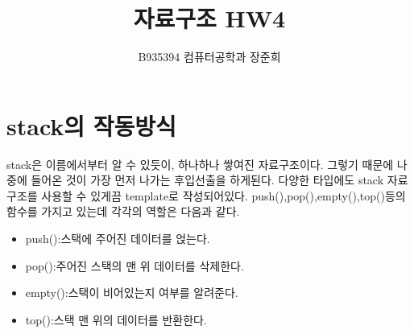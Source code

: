 \documentclass[a4paper,11pt]{article}
\begin{document}
\title{자료구조 HW4}
\author{B935394 컴퓨터공학과 장준희}
\maketitle
\newpage
\section{stack의 작동방식}
stack은 이름에서부터 알 수 있듯이, 하나하나 쌓여진 자료구조이다. 그렇기 때문에 나중에 들어온 것이 가장 먼저 나가는 후입선출을 하게된다. 다양한 타입에도 stack 자료구조를 사용할 수 있게끔 template로 작성되어있다. push(),pop(),empty(),top()등의 함수를 가지고 있는데 각각의 역할은 다음과 같다.
\begin{itemize}\item push():스택에 주어진 데이터를 얹는다.\item pop():주어진 스택의 맨 위 데이터를 삭제한다.\item empty():스택이 비어있는지 여부를 알려준다.\item top():스택 맨 위의 데이터를 반환한다. \end{itemize}
\end{document}
